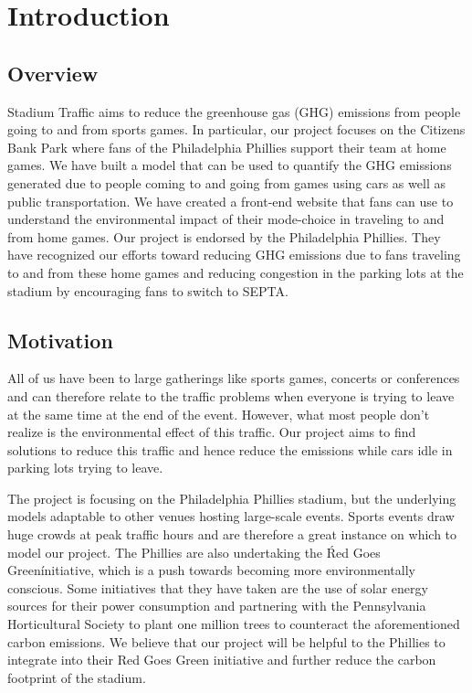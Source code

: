 \section{Introduction}
\subsection{Overview}
Stadium Traffic aims to reduce the greenhouse gas (GHG) emissions from
people going to and from sports games. In particular, our project
focuses on the Citizens Bank Park where fans of the Philadelphia
Phillies support their team at home games. We have built a model that
can be used to quantify the GHG emissions generated due to people
coming to and going from games using cars as well as public
transportation. We have created a front-end website that fans can use
to understand the environmental impact of their mode-choice in
traveling to and from home games. Our project is endorsed by the
Philadelphia Phillies. They have recognized our efforts toward
reducing GHG emissions due to fans traveling to and from these home
games and reducing congestion in the parking lots at the stadium by
encouraging fans to switch to SEPTA.

\subsection{Motivation}
All of us have been to large gatherings like sports games, concerts or
conferences and can therefore relate to the traffic problems when
everyone is trying to leave at the same time at the end of the
event. However, what most people don't realize is the environmental
effect of this traffic. Our project aims to find solutions to reduce
this traffic and hence reduce the emissions while cars idle in parking
lots trying to leave.

The project is focusing on the Philadelphia Phillies stadium, but the
underlying models adaptable to other venues hosting large-scale
events. Sports events draw huge crowds at peak traffic hours and are
therefore a great instance on which to model our project. The Phillies
are also undertaking the \'Red Goes Green\' initiative, which is a push
towards becoming more environmentally conscious. Some initiatives that
they have taken are the use of solar energy sources for their power
consumption and partnering with the Pennsylvania Horticultural Society
to plant one million trees to counteract the aforementioned carbon
emissions. We believe that our project will be helpful to the Phillies
to integrate into their Red Goes Green initiative and further reduce
the carbon footprint of the stadium.

